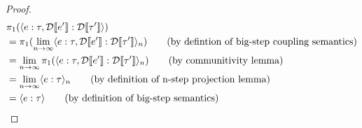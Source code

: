 \begin{proof}
	\begin{align*}
		&\pi_1(\langle e : \tau, \mathcal{D}\llbracket e' \rrbracket : \mathcal{D}\llbracket \tau' \rrbracket \rangle) \\
		&= \pi_1(\lim_{n \to \infty} \langle e : \tau, \mathcal{D}\llbracket e' \rrbracket : \mathcal{D}\llbracket \tau' \rrbracket \rangle_{n}) \tag{by defintion of big-step coupling semantics} \\
		&= \lim_{n \to \infty} \pi_1(\langle e : \tau, \mathcal{D}\llbracket e' \rrbracket : \mathcal{D}\llbracket \tau' \rrbracket \rangle_{n}) \tag{by communitivity lemma} \\
		&= \lim_{n \to \infty} \langle e : \tau \rangle_{n} \tag{by definition of n-step projection lemma} \\
		&= \langle e : \tau \rangle \tag{by definition of big-step semantics}
	\end{align*}
\end{proof}


